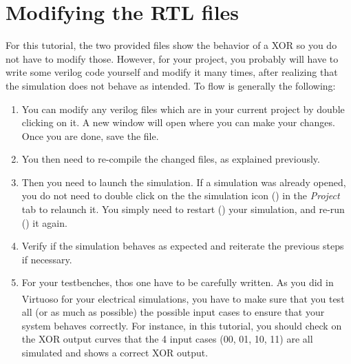 \section{Modifying the RTL files}
For this tutorial, the two provided files show the behavior of a XOR so you do not have to modify those. However, for your project, you probably will have to write some verilog code yourself and modify it many times, after realizing that the simulation does not behave as intended. To flow is generally the following:

\begin{enumerate}
	\item You can modify any verilog files which are in your current project by double clicking on it. A new window will open where you can make your changes. Once you are done, save the file.
	\item You then need to re-compile the changed files, as explained previously.
	\item Then you need to launch the simulation. If a simulation was already opened, you do not need to double click on the the simulation icon () in the \textit{Project} tab to relaunch it. You simply need to restart () your simulation, and re-run () it again.
	\item Verify if the simulation behaves as expected and reiterate the previous steps if necessary.
	\item For your testbenches, thos one have to be carefully written. As you did in Virtuoso\textsuperscript{\tiny\textregistered} for your electrical simulations, you have to make sure that you test all (or as much as possible) the possible input cases to ensure that your system behaves correctly. For instance, in this tutorial, you should check on the XOR output curves that the 4 input cases (00, 01, 10, 11) are all simulated and shows a correct XOR output.
\end{enumerate}


